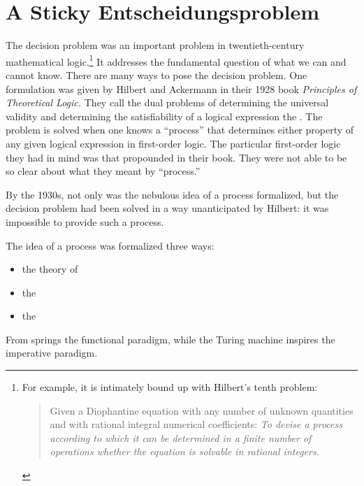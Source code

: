 \label{background:beginnings}
\section[A Sticky \foreign{Entscheidungsproblem}]{A Sticky Entscheidungsproblem}
The decision problem %
was an important problem in twentieth-century mathematical logic.\footnote{For example, it is intimately bound up with Hilbert's tenth problem: 
\begin{quote}
Given a Diophantine equation with any number of unknown quantities and with rational integral numerical coefficients: \emph{To devise a process according to which it can be determined in a finite number of operations whether the equation is solvable in rational integers.}
\end{quote}
}
It addresses the fundamental question of what we can and cannot know. There are many ways to pose the decision problem. One formulation was given by Hilbert and Ackermann in their 1928 book \textit{Principles of Theoretical Logic.} They call the dual problems of determining the universal validity and determining the satisfiability of a logical expression the . The problem is solved when one knows a ``process'' that determines either property of any given logical expression in first-order logic. The particular first-order logic they had in mind was that propounded in their book.%
They were not able to be so clear about what they meant by ``process.''

By the 1930s, not only was the nebulous idea of a process formalized, but the decision problem had been solved in a way unanticipated by Hilbert: it was impossible to provide such a process.

The idea of a process was formalized three ways:
\begin{itemize}
\item the theory of 
\item the \vocab{\lambdacalc}
\item the 
\end{itemize}
From \lambdacalc springs the functional paradigm, while the Turing machine inspires the imperative paradigm. %

